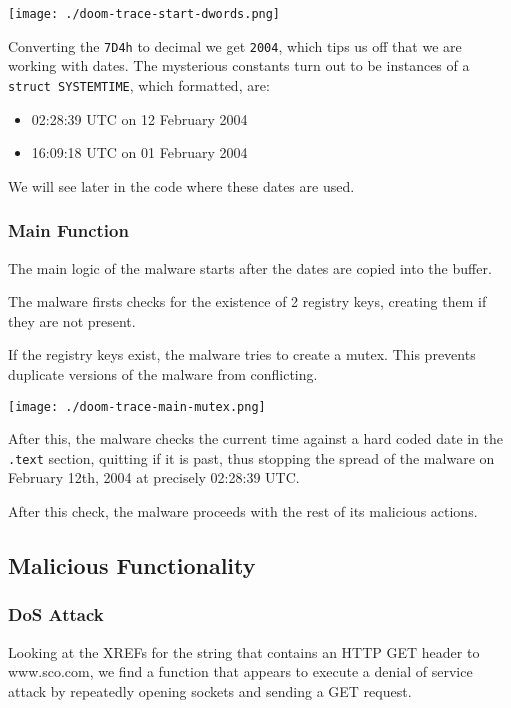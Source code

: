 \documentclass[11pt]{article}
\begin{document}
\begin{center}
\texttt{[image: ./doom-trace-start-dwords.png]}
\end{center}

Converting the \texttt{7D4h} to decimal we get \texttt{2004}, which tips us off that
we are working with dates. The mysterious constants turn out to be
instances of a \texttt{struct SYSTEMTIME}, which formatted, are:

\begin{itemize}
\item 02:28:39 UTC on 12 February 2004
\item 16:09:18 UTC on 01 February 2004
\end{itemize}

We will see later in the code where these dates are used.
\subsubsection{Main Function}
\label{sec:org99b1ed9}
The main logic of the malware starts after the dates are copied into
the buffer.

The malware firsts checks for the existence of 2 registry keys,
creating them if they are not present.

If the registry keys exist, the malware tries to create a mutex. This
prevents duplicate versions of the malware from conflicting.

\begin{center}
\texttt{[image: ./doom-trace-main-mutex.png]}
\end{center}

After this, the malware checks the current time against a hard coded
date in the \texttt{.text} section, quitting if it is past, thus stopping the
spread of the malware on February 12th, 2004 at precisely 02:28:39
UTC.

After this check, the malware proceeds with the rest of its malicious
actions.
\subsection{Malicious Functionality}
\label{sec:org03d55a6}
\subsubsection{DoS Attack}
\label{sec:org9b21761}
Looking at the XREFs for the string that contains an HTTP GET header
to www.sco.com, we find a function that appears to execute a denial of
service attack by repeatedly opening sockets and sending a GET
request.
\end{document}
